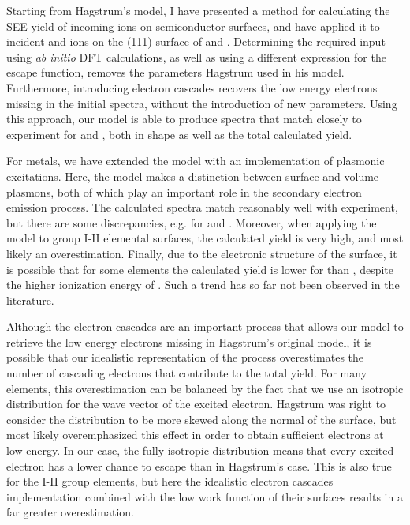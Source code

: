 \begin{refsection}
Starting from Hagstrum's model, I have presented a method for calculating the 
SEE yield of incoming ions on semiconductor surfaces, and have applied it to 
incident  and  ions on the (111) surface of  and 
. Determining the required input using \textit{ab initio} DFT 
calculations, as well as using a different expression for the escape function, 
removes the parameters Hagstrum used in his model. Furthermore, introducing 
electron cascades recovers the low energy electrons missing in the initial spectra,
without the introduction of new parameters. Using this approach, our model is 
able to produce spectra that match closely to experiment for  and 
, both in shape as well as the total calculated yield.

For metals, we have extended the model with an implementation of plasmonic 
excitations. Here, the model makes a distinction between surface and volume 
plasmons, both of which play an important role in the secondary electron emission 
process. The calculated spectra match reasonably well with experiment, but there 
are some discrepancies, e.g. for  and . Moreover, when applying the 
model to group I-II elemental surfaces, the calculated yield is very high, and 
most likely an overestimation. Finally, due to the electronic structure of the 
surface, it is possible that for some elements the calculated yield is lower 
for  than , despite the higher ionization energy of . Such 
a trend has so far not been observed in the literature.

Although the electron cascades are an important process that allows our model
to retrieve the low energy electrons missing in Hagstrum's original model, it 
is possible that our idealistic representation of the process overestimates 
the number of cascading electrons that contribute to the total yield. For many 
elements, this overestimation can be balanced by the fact that we use an isotropic 
distribution for the wave vector of the excited electron. Hagstrum was right to
consider the distribution to be more skewed along the normal of the surface, but 
most likely overemphasized this effect in order to obtain sufficient electrons
at low energy. In our case, the fully isotropic distribution means that every 
excited electron has a lower chance to escape than in Hagstrum's case. This is
also true for the I-II group elements, but here the idealistic electron cascades 
implementation combined with the low work function of their surfaces 
results in a far greater overestimation.


\end{refsection}
